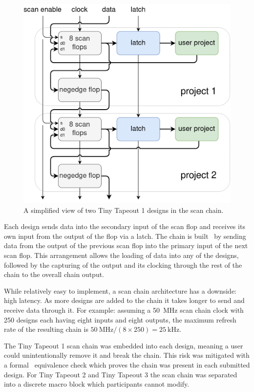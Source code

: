 \begin{figure}[!t]
\centering
\includegraphics[width=\columnwidth]{./Figs/scanchain_block_diagram.png}
\caption{A simplified view of two Tiny Tapeout 1 designs in the scan chain.}
\label{fig:simplified_view_2_designs}
\end{figure}

Each design sends data into the secondary input of the scan flop and receives its own input from the output of the flop via a latch.
The chain is built~\cite{updateiodesign} by sending data from the output of the previous scan flop into the primary input of the next scan flop.
This arrangement allows the loading of data into any of the designs, followed by the capturing of the output and its clocking through the rest of the chain to the overall chain output.

While relatively easy to implement, a scan chain architecture has a downside: high latency.
As more designs are added to the chain it takes longer to send and receive data through it.
For example: assuming a \qty{50}{\MHz} scan chain clock with 250 designs each having eight inputs and eight outputs, the maximum refresh rate of the resulting chain is $\qty{50}{\MHz} / (8 \times 250) = \qty{25}{\kHz}$.

The Tiny Tapeout 1 scan chain was embedded into each design, meaning a user could unintentionally remove it and break the chain.
This risk was mitigated with a formal~\cite{tinytapeoutscan} equivalence check which proves the chain was present in each submitted design.
For Tiny Tapeout 2 and Tiny Tapeout 3 the scan chain was separated into a discrete macro block which participants cannot modify.

